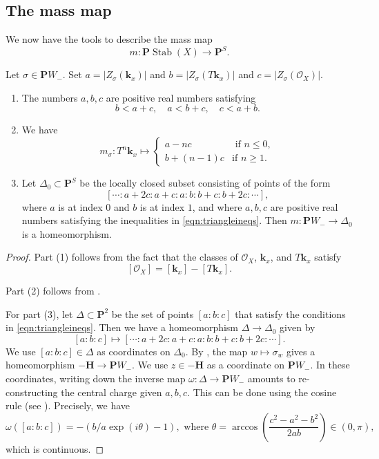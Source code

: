 \documentclass{amsart}
\begin{document}
\subsection{The mass map}
We now have the tools to describe the mass map
\[ m \colon \mathbf{P} \operatorname{Stab}(X) \to \mathbf{P}^S.\]
\begin{proposition}\label{prop:triangle0}
  Let \(\sigma \in \mathbf{P} W_{-}\).
  Set \(a = |Z_{\sigma}(\mathbf{k}_x)|\) and \(b = |Z_{\sigma}(T \mathbf{k}_{x})|\) and \(c = |Z_{\sigma}(\mathcal{O}_X)|\).
  \begin{enumerate}
  \item \label{eqn:triangleineqs}   The numbers \(a, b, c\) are positive real numbers satisfying
   \[
    b < a + c, \quad a < b+c, \quad c < a + b.
   \]
  \item We have
  \[ m_{\sigma} \colon T^n \mathbf{k}_x \mapsto
    \begin{cases}
      a - n c &\text{ if } n \leq 0,\\
      b + (n-1) c & \text{if } n \geq 1.
    \end{cases}
  \]
  \item Let \(\Delta_{0} \subset \mathbf{P}^S\) be the locally closed subset consisting of points of the form
   \[ [\cdots :a+2c:a+c:a:b:b+c:b+2c: \cdots],\]
   where \(a\) is at index 0 and \(b\) is at index \(1\), and where \(a,b,c\) are positive real numbers satisfying the inequalities in \eqref{eqn:triangleineqs}.
   Then \(m \colon \mathbf{P}W_{-} \to \Delta_{0}\) is a homeomorphism.
 \end{enumerate}
\end{proposition}
\begin{proof}
  Part (1) follows from the fact that the classes of \(\mathcal{O}_X\), \(\mathbf{k}_x\), and \(T \mathbf{k}_x\) satisfy
  \[ [\mathcal{O}_X] = [\mathbf{k}_x] - [T \mathbf{k}_x].\]

  Part (2) follows from .

  For part (3), let \(\Delta \subset \mathbf{P}^2\) be the set of points \([a:b:c]\) that satisfy the conditions in \eqref{eqn:triangleineqs}.
  Then we have a homeomorphism \(\Delta \to \Delta_0\) given by
  \[ [a:b:c] \mapsto [\cdots:a+2c:a+c:a:b:b+c:b+2c:\cdots].\]
  We use \([a:b:c] \in \Delta\) as coordinates on \(\Delta_0\).
  By , the map \(w \mapsto \sigma_w\) gives a homeomorphism \(-\mathbf{H} \to \mathbf{P} W_{-}\).
  We use \(z \in -\mathbf{H}\) as a coordinate on \(\mathbf{P} W_-\).
  In these coordinates, writing down the inverse map \(\omega \colon \Delta \to \mathbf{P}W_-\) amounts to re-constructing the central charge given \(a,b,c\).
  This can be done using the cosine rule (see ).
  Precisely, we have
  \begin{equation}\label{eqn:inv-}
    \omega([a:b:c]) = - (b/a \exp(i \theta) - 1), \text{ where } \theta = \arccos \left( \frac{c^2-a^2-b^2}{2ab} \right) \in (0,\pi),
  \end{equation}
  which is continuous.
  \end{proof}
\end{document}
